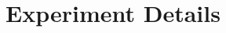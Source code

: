 \documentclass[twoside]{article}
\renewcommand{\eqref}[1]{(\ref{#1})}
\renewcommand{\t}{^{\mbox{\tiny\sf T}}} %
\newcommand{\tr}{\mathrm{tr}}
\renewcommand{\d}{\mathrm{d}}
\begin{document}



\section{Experiment Details} \label{App:exp_details}
\end{document}
